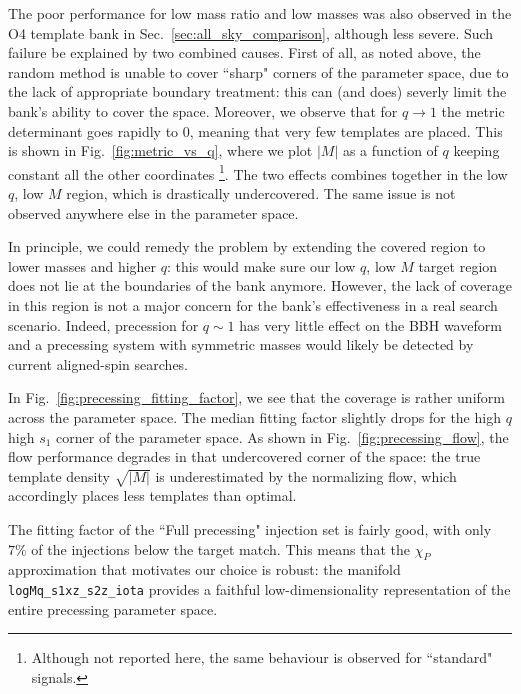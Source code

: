 \documentclass[twocolumn,showpacs,preprintnumbers,nofootinbib,prd,
superscriptaddress,10pt]{revtex4-2}
\begin{document}
The poor performance for low mass ratio and low masses was also observed in the O4 template bank in Sec.~\ref{sec:all_sky_comparison}, although less severe.
Such failure be explained by two combined causes.
First of all, as noted above, the random method is unable to cover ``sharp" corners of the parameter space, due to the lack of appropriate boundary treatment: this can (and does) severly limit the bank's ability to cover the space.
Moreover, we observe that for $q \to 1$ the metric determinant goes rapidly to $0$, meaning that very few templates are placed.  This is shown in Fig.~\ref{fig:metric_vs_q}, where we plot $|M|$ as a function of $q$ keeping constant all the other coordinates \footnote{Although not reported here, the same behaviour is observed for ``standard" signals.}.
The two effects combines together in the low $q$, low $M$ region, which is drastically undercovered. The same issue is not observed anywhere else in the parameter space.

In principle, we could remedy the problem by extending the covered region to lower masses and higher $q$: this would make sure our low $q$, low $M$ target region does not lie at the boundaries of the bank anymore.
However, the lack of coverage in this region is not a major concern for the bank's effectiveness in a real search scenario. Indeed, precession for $q\sim 1$ has very little effect on the BBH waveform and a precessing system with symmetric masses would likely be detected by current aligned-spin searches.

In Fig.~\ref{fig:precessing_fitting_factor}, we see that the coverage is rather uniform across the parameter space. The median fitting factor slightly drops for the high $q$ high $s_1$ corner of the parameter space.
As shown in Fig.~\ref{fig:precessing_flow}, the flow performance degrades in that undercovered corner of the space: the true template density $\sqrt{|M|}$ is underestimated by the normalizing flow, which accordingly places less templates than optimal.

The fitting factor of the ``Full precessing" injection set is fairly good, with only $7\%$ of the injections below the target match. This means that the $\chi_P$ approximation that motivates our choice is robust: the manifold \texttt{logMq\_s1xz\_s2z\_iota} provides a faithful low-dimensionality representation of the entire precessing parameter space.
\end{document}
